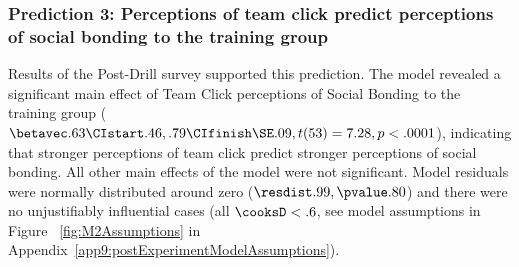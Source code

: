 

\subsubsection{Prediction 3: Perceptions of team click predict perceptions of social bonding to the training group}



Results of the Post-Drill survey supported this prediction. The model revealed a significant main effect of Team Click perceptions of Social Bonding to the training group ($\betavec .63 \CIstart .46, .79 \CIfinish \SE .09, t(53) = 7.28, p < .0001$), indicating that stronger perceptions of team click predict stronger perceptions of social bonding.  All other main effects of the model were not significant.  Model residuals were normally distributed around zero ($\resdist .99, \pvalue .80$) and there were no unjustifiably influential cases (all $\cooksD < .6$, see model assumptions in Figure ~\ref{fig:M2Assumptions} in Appendix~\ref{app9:postExperimentModelAssumptions}).







